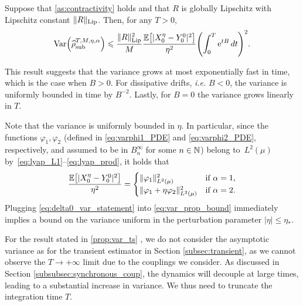 \begin{proposition}
	\label{prop:var_ts}
	Suppose that \cref{as:contractivity} holds and that $R$ is globally Lipschitz with Lipschitz constant $\|R\|_{\rm Lip}$. Then, for any $T>0$,
	\begin{equation}
		\Var\paren*{\aTSest} \leq \frac{\RLip^2}{M}\frac{\E\bkt*{|X_0^\eta - Y_0^0|^2}}{\eta^2}\paren*{\int_0^T \e^{tB} \, dt}^2.
	\label{eq:var_prop_bound}
	\end{equation}
\end{proposition}
%
This result suggests that the variance grows at most exponentially fast in time, which is the case when $B>0$. For dissipative drifts, \emph{i.e.} $B<0$, the variance is uniformly bounded in time by $B^{-2}$. Lastly, for $B=0$ the variance grows linearly in $T$.

Note that the variance is uniformly bounded in $\eta$. In particular, since the functions $\varphi_1,\varphi_2$ (defined in \eqref{eq:varphi1_PDE} and \eqref{eq:varphi2_PDE}, respectively, and assumed to be in $B^\infty_n$ for some $n\in\mathbb{N}$) belong to~$L^2(\mu)$ by~\eqref{eq:lyap_L1}--\eqref{eq:lyap_prod}, it holds that
%
\begin{equation}
	\frac{\E\bkt*{\abs{X_0^\eta - Y_0^0}^2}}{\eta^2} = 
	\begin{cases}
		\norm{\varphi_1}^2_{L^2(\mu)} &\text{if }\alpha = 1, \\
		\norm{\varphi_1 + \eta\varphi_2}^2_{L^2(\mu)} &\text{if }\alpha = 2.
	\end{cases}
	\label{eq:delta0_var_statement}
\end{equation}
%
%
Plugging \eqref{eq:delta0_var_statement} into \eqref{eq:var_prop_bound} immediately implies a bound on the variance uniform in the perturbation parameter $|\eta| \leq \eta_*$.

For the result stated in \cref{prop:var_ts} , we do not consider the asymptotic variance as for the transient estimator in Section \ref{subsec:transient}, as we cannot observe the $T\to+\infty$ limit due to the couplings we consider. As discussed in Section \ref{subsubsec:synchronous_coup}, the dynamics will decouple at large times, leading to a substantial increase in variance. We thus need to truncate the integration time $T$.
%

